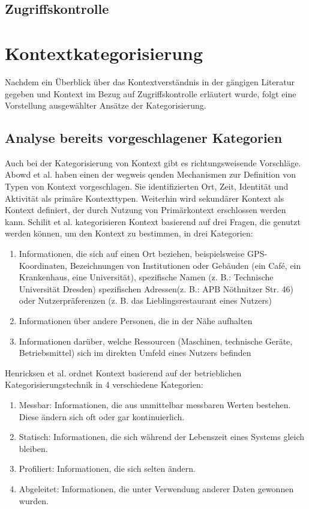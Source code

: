 \subsection{Zugriffskontrolle}
\section{Kontextkategorisierung}
Nachdem ein Überblick über das Kontextverständnis in der gängigen Literatur gegeben und Kontext im Bezug auf Zugriffskontrolle erläutert wurde, folgt eine Vorstellung ausgewählter Ansätze der Kategorisierung.
\subsection{ Analyse bereits vorgeschlagener Kategorien} 
Auch bei der Kategorisierung von Kontext gibt es richtungsweisende Vorschläge. Abowd et al. \cite{abowd_towards_1999} haben einen der wegweis qenden Mechanismen zur Definition von Typen von Kontext vorgeschlagen. Sie identifizierten Ort, Zeit, Identität und Aktivität als primäre Kontexttypen. Weiterhin wird sekundärer Kontext als Kontext definiert, der durch Nutzung von Primärkontext erschlossen werden kann. Schilit et al. \cite{schilit_context-aware_1994} kategorisieren Kontext basierend auf drei Fragen, die genutzt werden können, um den Kontext zu bestimmen, in drei Kategorien:
\begin{enumerate}
\item{Informationen, die sich auf einen Ort beziehen, beispielsweise GPS-Koordinaten, Bezeichnungen von Institutionen oder Gebäuden (ein Café, ein Krankenhaus, eine Universität), spezifische Namen (z. B.: Technische Universität Dresden) spezifischen Adressen(z. B.: APB Nöthnitzer Str. 46) oder Nutzerpräferenzen (z. B. das Lieblingsrestaurant eines Nutzers) }
\item{Informationen über andere Personen, die in der Nähe aufhalten}
\item{Informationen darüber, welche Ressourcen (Maschinen, technische Geräte, Betriebsmittel) sich im direkten Umfeld eines Nutzers befinden}
\end{enumerate}
Henricksen et al. \cite{henricksen2003framework} ordnet Kontext basierend auf der betrieblichen Kategorisierungstechnik in 4 verschiedene Kategorien:
\begin{enumerate}
\item {Messbar: Informationen, die aus unmittelbar messbaren Werten bestehen. Diese ändern sich oft oder gar kontinuierlich. }
\item {Statisch: Informationen, die sich während der Lebenszeit eines Systems gleich bleiben.}
\item {Profiliert: Informationen, die sich selten ändern.}
\item {Abgeleitet: Informationen, die unter Verwendung anderer Daten gewonnen wurden. }
\end{enumerate}
